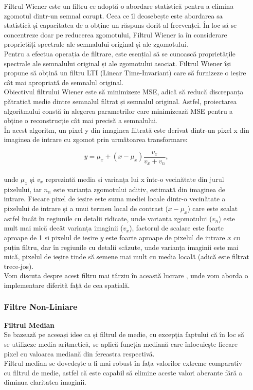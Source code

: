 \documentclass[12pt]{article}
\begin{document}
\indent Filtrul Wiener este un filtru ce adoptă o abordare statistică pentru a elimina zgomotul dintr-un semnal corupt. Ceea ce îl deosebește este abordarea sa statistică și capacitatea de a obține un răspuns dorit al frecvenței. În loc să se concentreze doar pe reducerea zgomotului, Filtrul Wiener ia în considerare proprietăți spectrale ale semnalului original și ale zgomotului. \\
\indent Pentru a efectua operația de filtrare, este esențial să se cunoască proprietățile spectrale ale semnalului original și ale zgomotului asociat. Filtrul Wiener își propune să obțină un filtru LTI (Linear Time-Invariant) care să furnizeze o ieșire cât mai apropriată de semnalul original.\\
\indent Obiectivul filtrului Wiener este să minimizeze MSE, adică să reducă discrepanța pătratică medie dintre semnalul filtrat și semnalul original. Astfel, proiectarea algoritmului constă în alegerea parametrilor care minimizează MSE pentru a obține o reconstrucție cât mai precisă a semnalului. \\
\indent În acest algoritm, un pixel y din imaginea filtrată este derivat dintr-un pixel x din imaginea de intrare cu zgomot prin următoarea transformare:

\begin{equation}
y = \mu_x + (x - \mu_x) \frac{v_x}{v_x + v_n},
\end{equation} \\
unde ${\mu_x}$ și ${v_x}$ reprezintă media și varianța lui x într-o vecinătate din jurul pixelului, iar ${n_n}$ este varianța zgomotului aditiv, estimată din imaginea de intrare. 
Fiecare pixel de ieșire este suma mediei locale dintr-o vecinătate a pixelului de intrare și a unui termen local de contrast (${x - \mu_x}$) care este scalat astfel încât în regiunile cu detalii ridicate, unde varianța zgomotului (${v_n}$) este mult mai mică decât varianța imaginii (${v_x}$), factorul de scalare este foarte aproape de 1 și pixelul de ieșire ${y}$ este foarte aproape de pixelul de intrare ${x}$ cu puțin filtru, dar în regiunile cu detalii scăzute, unde varianța imaginii este mai mică, pixelul de ieșire tinde să semene mai mult cu media locală (adică este filtrat trece-jos). \\
\indent Vom discuta despre acest filtru mai târziu în această lucrare , unde vom aborda o implementare diferită față de cea spațială.


\subsubsection{Filtre Non-Liniare}
\textbf{Filtrul Median}\\
\indent Se bazează pe aceeași idee ca și filtrul de medie, cu excepția faptului că în loc să se utilizeze media aritmetică, se aplică funcția mediană care înlocuiește fiecare pixel cu valoarea mediană din fereastra respectivă.\\
\indent Filtrul median se dovedește a fi mai robust în fața valorilor extreme comparativ cu filtrul de medie, astfel că este capabil să elimine aceste valori aberante fără a diminua claritatea imaginii.
\end{document}
